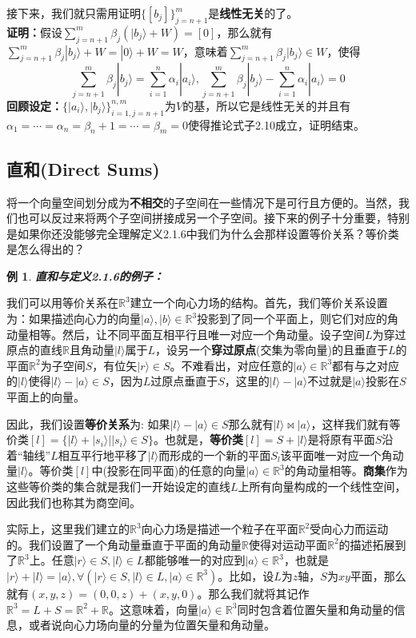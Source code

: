 \documentclass[mathserif,hyperref,UTF8,openany,b5paper]{ctexbook}
\newtheorem{exmp}{例}[section]
\begin{document}
接下来，我们就只需用证明$\{[b_j]\}_{j=n+1}^m $是\textbf{线性无关}的了。\\ \textbf{证明：}假设$ \sum_{j=n+1}^m  \beta_j (|b_j\rangle + W) = [0]$，那么就有$\sum_{j=n+1}^m  \beta_j |b_j\rangle + W = |0\rangle + W = W$，意味着$\sum_{j=n+1}^m  \beta_j |b_j\rangle \in W$，使得
\begin{equation}
    \sum_{j=n+1}^m  \beta_j |b_j\rangle = \sum_{i=1}^{n} \alpha_i|a_i\rangle, \sum_{j=n+1}^m  \beta_j |b_j\rangle - \sum_{i=1}^{n} \alpha_i|a_i\rangle = 0
\end{equation}
\textbf{回顾设定：}$\{|a_i\rangle,|b_j\rangle\}^{n,m}_{i=1,j=n+1}$为$V$的基，所以它是线性无关的并且有$\alpha_1=\cdots=\alpha_n=\beta_n+1=\cdots=\beta_m=0$使得推论式子2.10成立，证明结束。
\subsection{直和(Direct Sums)}
将一个向量空间划分成为\textbf{不相交}的子空间在一些情况下是可行且方便的。当然，我们也可以反过来将两个子空间拼接成另一个子空间。接下来的例子十分重要，特别是如果你还没能够完全理解定义2.1.6中我们为什么会那样设置等价关系？等价类是怎么得出的？
\begin{exmp}\textbf{直和与定义2.1.6的例子：}\end{exmp}
我们可以用等价关系在$\mathbb{R}^3$建立一个向心力场的结构。首先，我们等价关系设置为：如果描述向心力的向量$|a\rangle,|b\rangle \in \mathbb{R}^3$投影到了同一个平面上，则它们对应的角动量相等。然后，让不同平面互相平行且唯一对应一个角动量。设子空间$L$为穿过原点的直线$\mathbb{R}$且角动量$|l\rangle$属于$L$，设另一个\textbf{穿过原点}(交集为零向量)的且垂直于$L$的平面$\mathbb{R}^2$为子空间$S$，有位矢$|r\rangle \in S$。不难看出，对应任意的$|a\rangle \in \mathbb{R}^3$都有与之对应的$|l\rangle$使得$|l\rangle - |a\rangle \in S$，因为$L$过原点垂直于$S$，这里的$|l\rangle - |a\rangle$不过就是$|a\rangle$投影在$S$平面上的向量。

因此，我们设置\textbf{等价关系}为: 如果$|l\rangle - |a\rangle \in S$那么就有$|l\rangle \bowtie |a\rangle$，这样我们就有等价类$[l]=\{|l\rangle + |s_i\rangle||s_i\rangle \in S\}$。也就是，\textbf{等价类}$[l]=S+|l\rangle$是将原有平面$S$沿着“轴线”$L$相互平行地平移了$|l\rangle$而形成的一个新的平面$S_l$该平面唯一对应一个角动量$|l\rangle$。等价类$[l]$中(投影在同平面)的任意的向量$|a\rangle \in \mathbb{R}^3$的角动量相等。\textbf{商集}作为这些等价类的集合就是我们一开始设定的直线$L$上所有向量构成的一个线性空间，因此我们也称其为商空间。

实际上，这里我们建立的$\mathbb{R}^3$向心力场是描述一个粒子在平面$\mathbb{R}^2$受向心力而运动的。我们设置了一个角动量垂直于平面的角动量$\mathbb{R}$使得对运动平面$\mathbb{R}^2$的描述拓展到了$\mathbb{R}^3$上。任意$|r\rangle \in S, |l\rangle \in L$都能够唯一的对应到$|a\rangle \in \mathbb{R}^3$，也就是$|r\rangle + |l\rangle = |a\rangle, \forall (|r\rangle \in S, |l\rangle \in L,|a\rangle \in \mathbb{R}^3)$。比如，设$L$为$z$轴，$S$为$xy$平面，那么就有$(x,y,z)=(0,0,z)+(x,y,0)$。那么我们就将其记作$\mathbb{R}^3 = L+S=\mathbb{R}^2+\mathbb{R}$。这意味着，向量$|a\rangle \in \mathbb{R}^3$同时包含着位置矢量和角动量的信息，或者说向心力场向量的分量为位置矢量和角动量。
\end{document}
